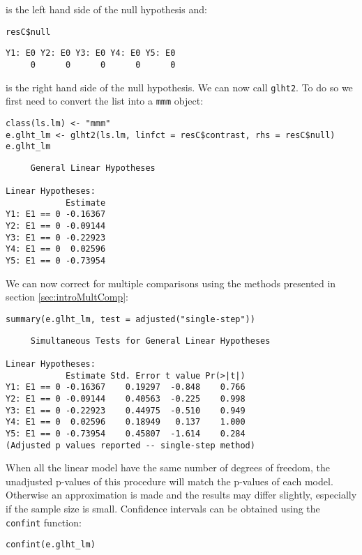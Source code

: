 \documentclass{article}
\begin{document}
is the left hand side of the null hypothesis and:
\lstset{language=r,label= ,caption= ,captionpos=b,numbers=none}
\begin{lstlisting}
resC$null
\end{lstlisting}

\begin{verbatim}
Y1: E0 Y2: E0 Y3: E0 Y4: E0 Y5: E0 
     0      0      0      0      0
\end{verbatim}

is the right hand side of the null hypothesis. We can now call
\texttt{glht2}. To do so we first need to convert the list into a \texttt{mmm} object:
\lstset{language=r,label= ,caption= ,captionpos=b,numbers=none}
\begin{lstlisting}
class(ls.lm) <- "mmm"
e.glht_lm <- glht2(ls.lm, linfct = resC$contrast, rhs = resC$null)
e.glht_lm
\end{lstlisting}

\begin{verbatim}
	 General Linear Hypotheses

Linear Hypotheses:
            Estimate
Y1: E1 == 0 -0.16367
Y2: E1 == 0 -0.09144
Y3: E1 == 0 -0.22923
Y4: E1 == 0  0.02596
Y5: E1 == 0 -0.73954
\end{verbatim}

We can now correct for multiple comparisons using the methods
presented in section \ref{sec:introMultComp}:
\lstset{language=r,label= ,caption= ,captionpos=b,numbers=none}
\begin{lstlisting}
summary(e.glht_lm, test = adjusted("single-step"))
\end{lstlisting}

\begin{verbatim}
	 Simultaneous Tests for General Linear Hypotheses

Linear Hypotheses:
            Estimate Std. Error t value Pr(>|t|)
Y1: E1 == 0 -0.16367    0.19297  -0.848    0.766
Y2: E1 == 0 -0.09144    0.40563  -0.225    0.998
Y3: E1 == 0 -0.22923    0.44975  -0.510    0.949
Y4: E1 == 0  0.02596    0.18949   0.137    1.000
Y5: E1 == 0 -0.73954    0.45807  -1.614    0.284
(Adjusted p values reported -- single-step method)
\end{verbatim}

When all the linear model have the same number of degrees of freedom,
the unadjusted p-values of this procedure will match the p-values of
each model. Otherwise an approximation is made and the results may
differ slightly, especially if the sample size is small. Confidence
intervals can be obtained using the \texttt{confint} function:
\lstset{language=r,label= ,caption= ,captionpos=b,numbers=none}
\begin{lstlisting}
confint(e.glht_lm)
\end{lstlisting}
\end{document}
